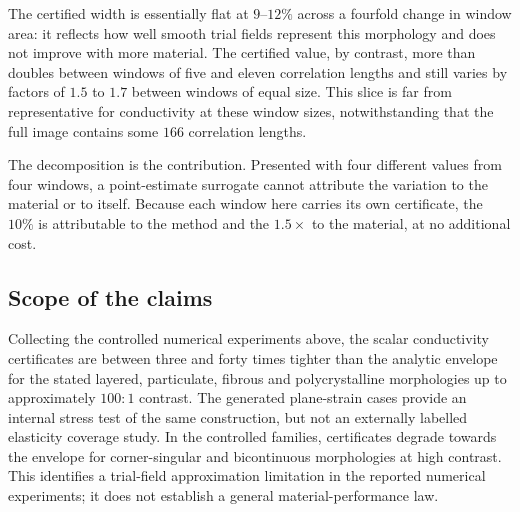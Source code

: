 \begin{table}[t]
\centering
\caption{Berea sandstone: certified width and certified value as the
window grows. Three disjoint windows per size, all gate-accepted. Width is
a property of the method and is nearly constant; value is a property of the
window and is not.}
\label{tab:rve}

\end{table}

The certified width is essentially flat at $9$--$12\%$ across a fourfold
change in window area: it reflects how well smooth trial fields represent
this morphology and does not improve with more material. The certified
value, by contrast, more than doubles between windows of five and eleven
correlation lengths and still varies by factors of $1.5$ to $1.7$ between
windows of equal size. This slice is far from representative for
conductivity at these window sizes, notwithstanding that the full image
contains some $166$ correlation lengths.

The decomposition is the contribution. Presented with four different values
from four windows, a point-estimate surrogate cannot attribute the
variation to the material or to itself. Because each window here carries
its own certificate, the $10\%$ is attributable to the method and the
$1.5\times$ to the material, at no additional cost.

\subsection{Scope of the claims}
\label{sec:limits:scope}

Collecting the controlled numerical experiments above, the scalar
conductivity certificates are between three and forty times tighter than the
analytic envelope for the stated layered, particulate, fibrous and
polycrystalline morphologies up to approximately $100{:}1$ contrast. The
generated plane-strain cases provide an internal stress test of the same
construction, but not an externally labelled elasticity coverage study. In
the controlled families, certificates degrade towards the envelope for
corner-singular and bicontinuous morphologies at high contrast. This
identifies a trial-field approximation limitation in the reported numerical
experiments; it does not establish a general material-performance law.
